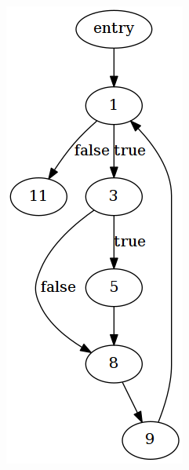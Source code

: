 \begin{figure}[htbp]
	\centering
	\begin{subfigure}[ht]{0.38\textwidth}
		
	\end{subfigure}
	\qquad
	\begin{subfigure}[ht]{0.20\textwidth}
		\includegraphics[width=\textwidth]{appendices/ll2dot_example/example1_graphs/main.png}

\end{subfigure}
\end{figure}
